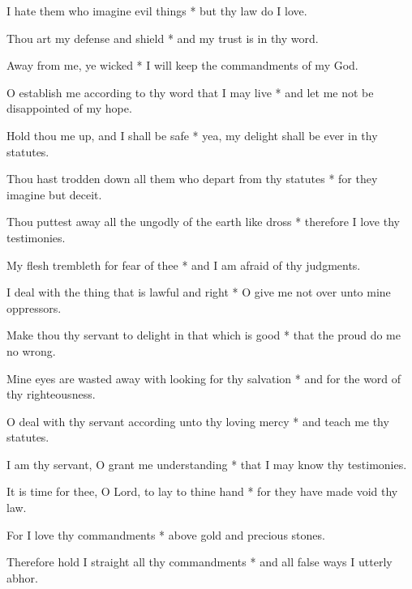 I hate them who imagine evil things * but thy law do I love.

Thou art my defense and shield * and my trust is in thy word.

Away from me, ye wicked * I will keep the commandments of my God.

O establish me according to thy word that I may live * and let me not be disappointed of my hope.

Hold thou me up, and I shall be safe * yea, my delight shall be ever in thy statutes.

Thou hast trodden down all them who depart from thy statutes * for they imagine but deceit.

Thou puttest away all the ungodly of the earth like dross * therefore I love thy testimonies.

My flesh trembleth for fear of thee * and I am afraid of thy judgments.

I deal with the thing that is lawful and right * O give me not over unto mine oppressors.

Make thou thy servant to delight in that which is good * that the proud do me no wrong.

Mine eyes are wasted away with looking for thy salvation * and for the word of thy righteousness.

O deal with thy servant according unto thy loving mercy * and teach me thy statutes.

I am thy servant, O grant me understanding * that I may know thy testimonies.

It is time for thee, O Lord, to lay to thine hand * for they have made void thy law.

For I love thy commandments * above gold and precious stones.

Therefore hold I straight all thy commandments * and all false ways I utterly abhor. 